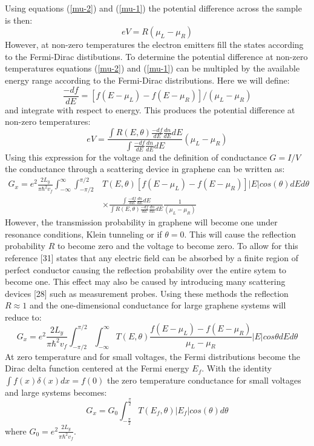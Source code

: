 \documentclass[12pt,a4paper]{article}
\begin{document}
			Using equations (\ref{mu-2}) and (\ref{mu-1}) the potential difference across the sample is then:
			\begin{equation}
				eV=R\left(\mu_{L}-\mu_{R}\right)
			\end{equation}
			However, at non-zero temperatures the electron emitters fill the states according to the Fermi-Dirac distibutions. To determine the potential difference at non-zero temperatures equations (\ref{mu-2}) and (\ref{mu-1}) can be multipled by the available energy range according to the Fermi-Dirac distributions. Here we will define:
			\begin{equation}
				\frac{-df}{dE}=\left[f\left(E-\mu_{L}\right)-f\left(E-\mu_{R}\right)\right]/\left(\mu_{L}-\mu_{R}\right)
			\end{equation}
			and integrate with respect to energy. This produces the potential difference at non-zero temperatures:
			\begin{equation}
				eV=\frac{\int R\left(E,\theta\right) \frac{-df}{dE} \frac{dn}{dE}dE}{\int\frac{-df}{dE} \frac{dn}{dE}dE}\left(\mu_{L}-\mu_{R}\right)
			\end{equation}
			Using this expression for the voltage and the definition of conductance $G=I/V$ the conductance through a scattering device in graphene can be written as:
			\begin{align}
				G_{x}=e^{2}\frac{2L_{y}}{\pi\hbar^{2}v_{f}}\int^{\infty}_{-\infty}\int^{\pi/2}_{-\pi/2}&T\left(E,\theta\right)\left[f\left(E-\mu_{L}\right)-f\left(E-\mu_{R}\right)\right]|E|cos\left(\theta\right)dEd\theta\\
				&\times\frac{\int\frac{-df}{dE} \frac{dn}{dE}dE}{\int R\left(E,\theta\right) \frac{-df}{dE} \frac{dn}{dE}dE}\frac{1}{\left(\mu_{L}-\mu_{R}\right)}
			\end{align}
			However, the transmission probability in graphene will become one under resonance conditions, Klein tunneling or if $\theta=0$. This will cause the reflection probability $R$ to become zero and the voltage to become zero. To allow for this reference [31] states that any electric field can be absorbed by a finite region of perfect conductor causing the reflection probability over the entire sytem to become one. This effect may also be caused by introducing many scattering devices [28] such as measurement probes. Using these methods the reflection $R \approx 1$ and the one-dimensional conductance for large graphene systems will reduce to:
			\begin{equation}
				G_{x}=e^{2}\frac{2L_{y}}{\pi\hbar^{2}v_{f}}\int^{\pi/2}_{-\pi/2} \int^{\infty}_{-\infty} T\left(E, \theta\right)\frac{f\left(E-\mu_{L}\right)-f\left(E-\mu_{R}\right)}{\mu_{L}-\mu_{R}}|E|cos\theta dE d\theta
			\end{equation}
			At zero temperature and for small voltages, the Fermi distributions become the Dirac delta function centered at the Fermi energy $E_{f}$. With the identity $\int f(x)\delta(x) dx=f(0)$ the zero temperature conductance for small voltages and large systems becomes:
			\begin{equation}
				G_{x}= G_{0}\int^{\frac{\pi}{2}}_{-\frac{\pi}{2}} T\left(E_{f},\theta\right)|E_{f}|cos\left(\theta\right)d\theta
			\end{equation}
			where $G_{0}=e^{2}\frac{2L_{y}}{\pi\hbar^{2}v_{f}}$.
\end{document}
